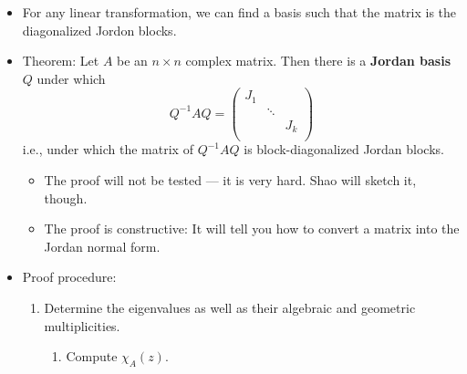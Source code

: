 \documentclass[../notes.tex]{subfiles}
\begin{document}
\begin{itemize}
    \item For any linear transformation, we can find a basis such that the matrix is the diagonalized Jordon blocks.
    \item Theorem: Let $A$ be an $n\times n$ complex matrix. Then there is a \textbf{Jordan basis} $Q$ under which
    \begin{equation*}
        Q^{-1}AQ =
        \begin{pmatrix}
            J_1 &  & \\
             & \ddots & \\
             &  & J_k\\
        \end{pmatrix}
    \end{equation*}
    i.e., under which the matrix of $Q^{-1}AQ$ is block-diagonalized Jordan blocks.
    \begin{itemize}
        \item The proof will not be tested --- it is very hard. Shao will sketch it, though.
        \item The proof is constructive: It will tell you how to convert a matrix into the Jordan normal form.
    \end{itemize}
    \item Proof procedure:
    \begin{enumerate}
        \item Determine the eigenvalues as well as their algebraic and geometric multiplicities.
        \begin{enumerate}
            \item Compute $\chi_A(z)$.

\end{enumerate}
\end{enumerate}
\end{itemize}
\end{document}

